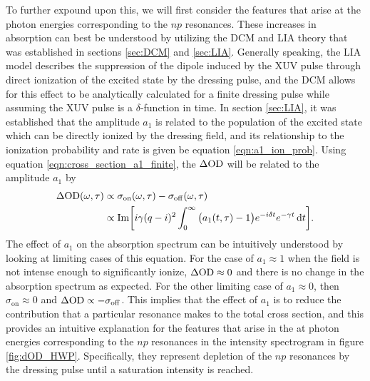 To further expound upon this, we will first consider the features that arise at the photon energies corresponding to the $np$ resonances.  These increases in absorption can best be understood by utilizing the DCM and LIA theory that was established in sections \ref{sec:DCM} and \ref{sec:LIA}.  Generally speaking, the LIA model describes the suppression of the dipole induced by the XUV pulse through direct ionization of the excited state by the dressing pulse, and the DCM allows for this effect to be analytically calculated for a finite dressing pulse while assuming the XUV pulse is a $\delta$-function in time.  In section \ref{sec:LIA}, it was established that the amplitude $a_1$ is related to the population of the excited state which can be directly ionized by the dressing field, and its relationship to the ionization probability and rate is given be equation \ref{eqn:a1_ion_prob}.  Using equation \ref{eqn:cross_section_a1_finite}, the $\Delta\mathrm{OD}$ will be related to the amplitude $a_1$ by
\begin{equation}
\label{eqn:dod_a1}
	\begin{aligned}
		\Delta\mathrm{OD}(\omega,\tau) & \propto \sigma_{\mathrm{on}}(\omega,\tau) - \sigma_{\mathrm{off}}(\omega,\tau)\\
		& \propto \mathrm{Im}\bigg[i\gamma(q-i)^2 \int_{0}^{\infty}\big(a_1(t,\tau) - 1\big)e^{-i\delta t}e^{-\gamma t}\mathop{}\!\mathrm{d} t\bigg].
	\end{aligned}
\end{equation}
The effect of $a_1$ on the absorption spectrum can be intuitively understood by looking at limiting cases of this equation.  For the case of $a_1\approx1$ when the field is not intense enough to significantly ionize, $\Delta\mathrm{OD}\approx0$ and there is no change in the absorption spectrum as expected.  For the other limiting case of $a_1\approx0$, then $\sigma_{\mathrm{on}}\approx0$ and $\Delta\mathrm{OD}\propto - \sigma_{\mathrm{off}}$.  This implies that the effect of $a_1$ is to reduce the contribution that a particular resonance makes to the total cross section, and this provides an intuitive explanation for the features that arise in the at photon energies corresponding to the $np$ resonances in the intensity spectrogram in figure \ref{fig:dOD_HWP}. Specifically, they represent depletion of the $np$ resonances by the dressing pulse until a saturation intensity is reached.

